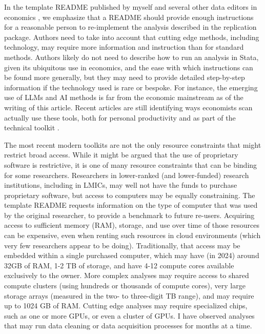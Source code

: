 \documentclass{Revue-economique}
\begin{document}
\begin{Article} [%
	Titre={Reproducibility and Open Science in Economics},
	Auteur={Lars Vilhuber\thanks{Cornell University, lars.vilhuber@cornell.edu}}]
\begin{refsection}[Main]
In the template README published by myself and several other data editors in economics \parencite{templateREADMEv1.1}, we emphasize that a README should provide enough instructions for a reasonable person to re-implement the analysis described in the replication package. Authors need to take into account that cutting edge methods, including technology, may require more information and instruction than for standard methods. Authors likely do not need to describe how to run an analysis in Stata, given its ubiquitous use in economics, and the ease with which instructions can be found more generally, but they may need to provide detailed step-by-step information if the technology used is rare or bespoke. For instance, the emerging use of \acp{LLM} and \ac{AI} methods is far from the economic mainstream as of the writing of this article. Recent articles are still identifying ways economists scan actually use these tools, both for personal productivity \parencite{korinek_generative_2023} and as part of the technical toolkit \parencite{athey_machine_2019,dell_deep_2024}. 

The most recent modern toolkits are not the only resource constraints that might restrict broad access. While it might be argued that the use of proprietary software is restrictive, it is one of many resource constraints that can be binding for some researchers. Researchers in lower-ranked (and lower-funded) research institutions, including in \acp{LMIC}, may well not have the funds to purchase proprietary software, but access to computers may be equally constraining. The template README requests information on the type of computer that was used by the original researcher, to provide a benchmark to future re-users. Acquiring access to sufficient memory (\ac{RAM}), storage, and use over time of those resources can be expensive, even when renting such resources in cloud environments (which very few researchers appear to be doing). Traditionally, that access may be embedded within a single purchased computer, which may have (in 2024) around 32GB of RAM, 1-2 TB of storage, and have 4-12 compute cores available exclusively to the owner. More complex analyses may require access to shared compute clusters (using hundreds or thousands of compute cores), very large storage arrays (measured in the two- to three-digit TB range), and may require up to 1024 GB of RAM. Cutting edge analyses may require specialized chips, such as one or more \acp{GPU}, or even a cluster of \acp{GPU}. I have observed analyses that may run data cleaning or data acquisition processes for months at a time. 


\end{refsection}
\end{Article}
\end{document}
